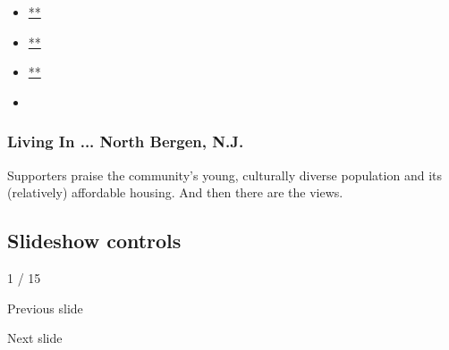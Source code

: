 \begin{itemize}
\item
  \href{https://www.facebook.com/sharer.php?app_id=9869919170\&u=https\%3A\%2F\%2Fwww.nytimes.com\%2Fslideshow\%2F2020\%2F07\%2F29\%2Frealestate\%2Fliving-in-north-bergen-nj.html\%3Fsmid\%3Dfb-share\&name=Living\%20In\%20...\%20North\%20Bergen\%2C\%20N.J.\&redirect_uri=https\%3A\%2F\%2Fwww.facebook.com\%2F}{**}
\item
  \href{https://twitter.com/intent/tweet?url=https\%3A\%2F\%2Fwww.nytimes.com\%2Fslideshow\%2F2020\%2F07\%2F29\%2Frealestate\%2Fliving-in-north-bergen-nj.html\%3Fsmid\%3Dtw-share\&text=Living\%20In\%20...\%20North\%20Bergen\%2C\%20N.J.}{**}
\item
  \href{mailto:?subject=NYTimes.com\%3A\%20Living\%20In\%20...\%20North\%20Bergen\%2C\%20N.J.\&body=From\%20The\%20New\%20York\%20Times\%3A\%0A\%0ALiving\%20In\%20...\%20North\%20Bergen\%2C\%20N.J.\%0A\%0ASupporters\%20praise\%20the\%20community\%E2\%80\%99s\%20young\%2C\%20culturally\%20diverse\%20population\%20and\%20its\%20(relatively)\%20affordable\%20housing.\%20And\%20then\%20there\%20are\%20the\%20views.\%0A\%0Ahttps\%3A\%2F\%2Fwww.nytimes.com\%2Fslideshow\%2F2020\%2F07\%2F29\%2Frealestate\%2Fliving-in-north-bergen-nj.html\%3Fsmid\%3Dem-share}{**}
\item
\end{itemize}

\hypertarget{living-in--north-bergen-nj-1}{%
\subsubsection{Living In ... North Bergen,
N.J.}\label{living-in--north-bergen-nj-1}}

Supporters praise the community's young, culturally diverse population
and its (relatively) affordable housing. And then there are the views.

\hypertarget{slideshow-controls}{%
\subsection{Slideshow controls}\label{slideshow-controls}}

1 / 15

Previous slide

Next slide
